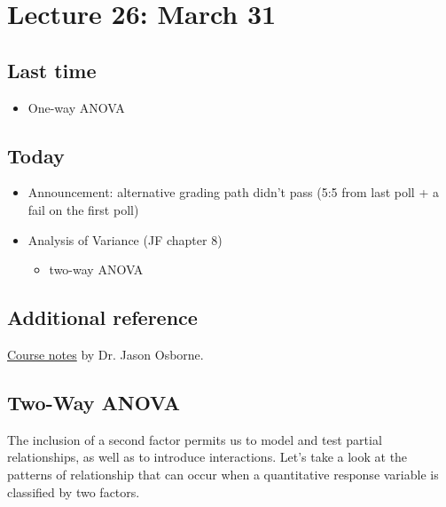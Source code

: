 \setcounter{section}{25}

\section{Lecture 26: March 31}


\subsection*{Last time}
\begin{itemize}
	\item One-way ANOVA
\end{itemize}


\subsection*{Today}
\begin{itemize}
	\item Announcement: alternative grading path didn't pass (5:5 from last poll + a fail on the first poll)
	\item Analysis of Variance (JF chapter 8)
	  \begin{itemize}
	  	\item two-way ANOVA
	  \end{itemize}
\end{itemize}

\subsection*{Additional reference}
\href{https://www4.stat.ncsu.edu/~osborne/st512r/handouts/allpackets.pdf}{Course notes} by Dr. Jason Osborne.

\subsection*{Two-Way ANOVA}
The inclusion of a second factor permits us to model and test partial relationships, as well as to introduce interactions.
Let's take a look at the patterns of relationship that can occur when a quantitative response variable is classified by two factors.


